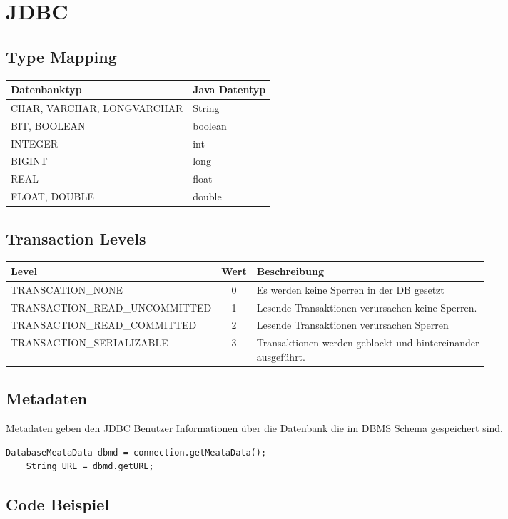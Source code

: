 \section{JDBC}

\subsection{Type Mapping}
\begin{tabular}{|l|l|}
    \hline
    \textbf{Datenbanktyp} & \textbf{Java Datentyp} \\
    \hline
    CHAR, VARCHAR, LONGVARCHAR & String \\
    \hline
    BIT, BOOLEAN &  boolean \\
    \hline
    INTEGER & int \\
    \hline
    BIGINT & long \\
    \hline
    REAL & float \\
    \hline
    FLOAT, DOUBLE & double \\
    \hline
\end{tabular}

\subsection{Transaction Levels}
\begin{tabular}{|l|c|l|}
    \hline
    \textbf{Level} & \textbf{Wert} & \textbf{Beschreibung} \\
    \hline
    TRANSCATION\_NONE & 0 & Es werden keine Sperren in der DB gesetzt \\
    \hline
    TRANSACTION\_READ\_UNCOMMITTED & 1 & Lesende Transaktionen verursachen keine Sperren. \\
    \hline
    TRANSACTION\_READ\_COMMITTED & 2 & Lesende Transaktionen verursachen Sperren \\
    \hline
    TRANSACTION\_SERIALIZABLE & 3 & \specialcell{Transaktionen werden geblockt und hintereinander\\ ausgeführt.} \\
    \hline
\end{tabular}

\subsection{Metadaten}
Metadaten geben den JDBC Benutzer Informationen über die Datenbank die im DBMS Schema gespeichert sind.
\begin{lstlisting}[style=customJava]
    DatabaseMeataData dbmd = connection.getMeataData();
    String URL = dbmd.getURL;
\end{lstlisting}

\subsection{Code Beispiel}



